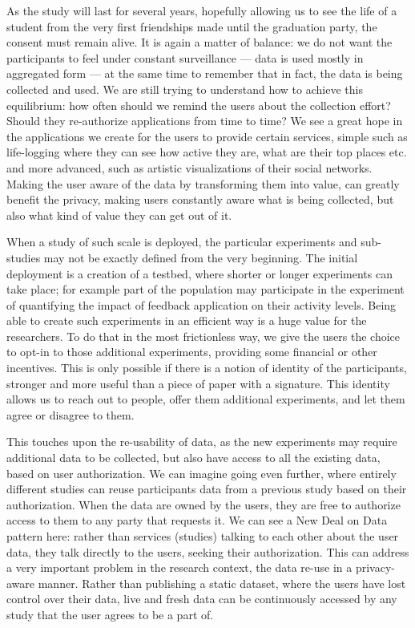 As the study will last for several years, hopefully allowing us to see the life of a student from the very first friendships made until the graduation party, the consent must remain alive.
It is again a matter of balance: we do not want the participants to feel under constant surveillance --- data is used mostly in aggregated form --- at the same time to remember that in fact, the data is being collected and used.
We are still trying to understand how to achieve this equilibrium: how often should we remind the users about the collection effort? Should they re-authorize applications from time to time?
We see a great hope in the applications we create for the users to provide certain services, simple such as life-logging where they can see how active they are, what are their top places etc. and more advanced, such as artistic visualizations of their social networks.
Making the user aware of the data by transforming them into value, can greatly benefit the privacy, making users constantly aware what is being collected, but also what kind of value they can get out of it.

When a study of such scale is deployed, the particular experiments and sub-studies may not be exactly defined from the very beginning.
The initial deployment is a creation of a testbed, where shorter or longer experiments can take place; for example part of the population may participate in the experiment of quantifying the impact of feedback application on their activity levels.
Being able to create such experiments in an efficient way is a huge value for the researchers. To do that in the most frictionless way, we give the users the choice to opt-in to those additional experiments, providing some financial or other incentives.
This is only possible if there is a notion of identity of the participants, stronger and more useful than a piece of paper with a signature.
This identity allows us to reach out to people, offer them additional experiments, and let them agree or disagree to them.

This touches upon the re-usability of data, as the new experiments may require additional data to be collected, but also have access to all the existing data, based on user authorization.
We can imagine going even further, where entirely different studies can reuse participants data from a previous study based on their authorization.
When the data are owned by the users, they are free to authorize access to them to any party that requests it. We can see a New Deal on Data pattern here: rather than services (studies) talking to each other about the user data, they talk directly to the users, seeking their authorization.
This can address a very important problem in the research context, the data re-use in a privacy-aware manner.
Rather than publishing a static dataset, where the users have lost control over their data, live and fresh data can be continuously accessed by any study that the user agrees to be a part of.


